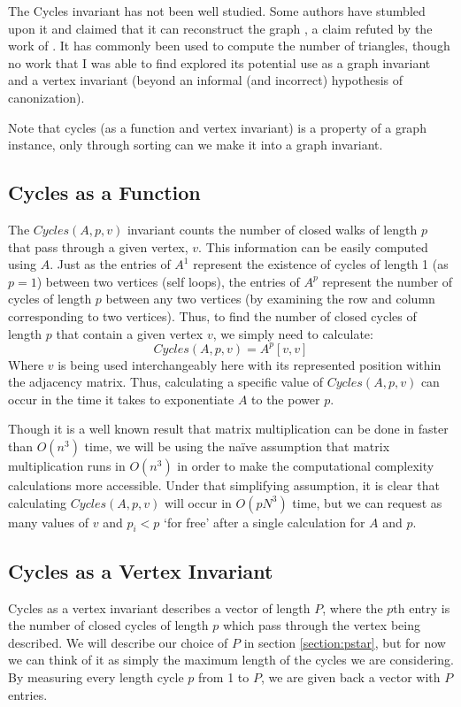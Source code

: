 The Cycles invariant has not been well studied. 
Some authors have stumbled upon it and claimed that it can reconstruct the graph \cite{cornell}, a claim refuted by the work of \cite{eigenspaces}.
It has commonly been used to compute the number of triangles, though no work that I was able to find explored its potential use as a graph invariant and a vertex invariant (beyond an informal (and incorrect) hypothesis of canonization). 

Note that cycles (as a function and vertex invariant) is a property of a graph instance, only through sorting can we make it into a graph invariant.


\subsection{Cycles as a Function}

The $Cycles(A, p, v)$ invariant counts the number of closed walks of length $p$ that pass through a given vertex, $v$. 
This information can be easily computed using $A$. 
Just as the entries of $A^1$ represent the existence of cycles of length 1 (as $p = 1$) between two vertices (self loops), the entries of $A^p$ represent the number of cycles of length $p$ between any two vertices (by examining the row and column corresponding to two vertices).
Thus, to find the number of closed cycles of length $p$ that contain a given vertex $v$, we simply need to calculate: 
$$Cycles(A, p, v) = A^p[v, v]$$
Where $v$ is being used interchangeably here with its represented position within the adjacency matrix. 
Thus, calculating a specific value of $Cycles(A, p, v)$ can occur in the time it takes to exponentiate $A$ to the power $p$.

Though it is a well known result that matrix multiplication can be done in faster than $O(n^3)$ time, we will be using the na\"{i}ve assumption that matrix multiplication runs in $O(n^3)$ in order to make the computational complexity calculations more accessible.  
Under that simplifying assumption, it is clear that calculating $Cycles(A, p, v)$ will occur in $O(p N^3)$ time, but we can request as many values of $v$ and $p_i < p$ `for free' after a single calculation for $A$ and $p$.


\subsection{Cycles as a Vertex Invariant}
\label{section:qsvsesdef2}
Cycles as a vertex invariant describes a vector of length $P$, where the $p$th entry is the number of closed cycles of length $p$ which pass through the vertex being described.
We will describe our choice of $P$ in section \ref{section:pstar}, but for now we can think of it as simply the maximum length of the cycles we are considering.
By measuring every length cycle $p$ from 1 to $P$, we are given back a vector with $P$ entries.

